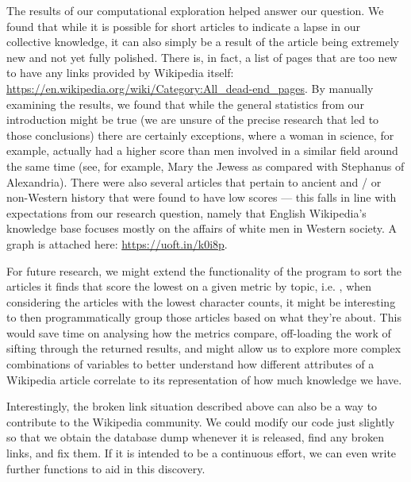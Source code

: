 \documentclass[fontsize=12pt]{article}
\begin{document}
\begin{multicols}{2}
    The results of our computational exploration helped answer our question.
    We found that while it is possible for short articles to indicate a lapse in our collective knowledge, it can also simply be a result of the article being extremely new and not yet fully polished.
    There is, in fact, a list of pages that are too new to have any links provided by Wikipedia itself: \href{https://en.wikipedia.org/wiki/Category:All\_dead-end\_pages}{https://en.wikipedia.org/wiki/Category:All\_dead-end\_pages}.
    By manually examining the results, we found that while the general statistics from our introduction might be true (we are unsure of the precise research that led to those conclusions) there are certainly exceptions, where a woman in science, for example, actually had a higher score than men involved in a similar field around the same time (see, for example, Mary the Jewess as compared with Stephanus of Alexandria).
    There were also several articles that pertain to ancient and / or non-Western history that were found to have low scores --- this falls in line with expectations from our research question, namely that English Wikipedia's knowledge base focuses mostly on the affairs of white men in Western society.
    A graph is attached here: \href{https://uoft.in/k0i8p}{https://uoft.in/k0i8p}.

    For future research, we might extend the functionality of the program to sort the articles it finds that score the lowest on a given metric by topic, i.e.
    , when considering the articles with the lowest character counts, it might be interesting to then programmatically group those articles based on what they're about.
    This would save time  on analysing how the metrics compare, off-loading the work of sifting through the returned results, and might allow us to explore more complex combinations of variables to better understand how different attributes of a Wikipedia article correlate to its representation of how much knowledge we have.

    Interestingly, the broken link situation described above can also be a way to contribute to the Wikipedia community.
    We could modify our code just slightly so that we obtain the database dump whenever it is released, find any broken links, and fix them.
    If it is intended to be a continuous effort, we can even write further functions to aid in this discovery.

\end{multicols}

\linespread{2}
\newpage
\nocite{*}
\printbibliography[title={\centering References}]
\end{document}
